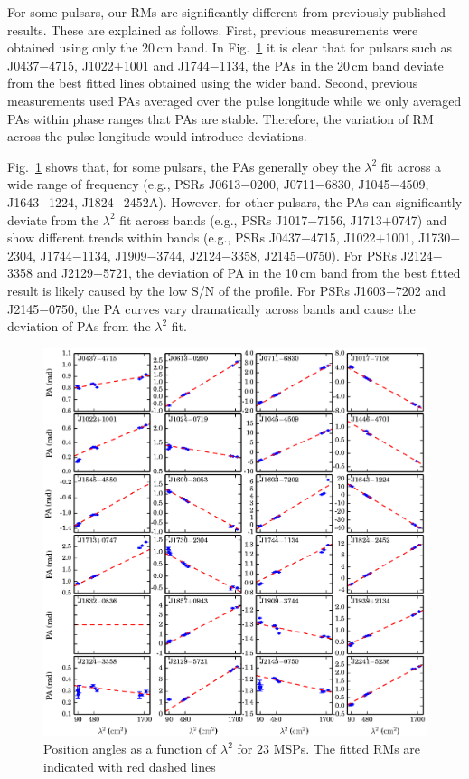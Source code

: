 \documentclass[useAMS,usenatbib]{mn2e}
\begin{document}
For some pulsars, our RMs are significantly different from previously published results. 
These are explained as follows.
%
First, previous measurements were obtained using only the 20\,cm band. 
In Fig.~\ref{rmFreq} it is clear that for pulsars such as J0437$-$4715,
J1022$+$1001 and J1744$-$1134, the PAs in the 20\,cm band deviate from the 
best fitted lines obtained using the wider band.
%
Second, previous measurements used PAs averaged over the pulse longitude 
while we only averaged PAs within phase ranges that PAs are stable. Therefore, 
the variation of RM across the pulse longitude would introduce deviations.
%

Fig.~\ref{rmFreq} shows that, for some pulsars, the PAs generally obey the 
$\lambda^2$ fit across a wide range of frequency (e.g., PSRs J0613$-$0200, 
J0711$-$6830, J1045$-$4509, J1643$-$1224, J1824$-$2452A). 
%
However, for other pulsars, the PAs can significantly deviate from the $\lambda^2$ fit
across bands (e.g., PSRs J1017$-$7156, J1713$+$0747) and show different trends within bands 
(e.g., PSRs J0437$-$4715, J1022$+$1001, J1730$-$2304, J1744$-$1134, J1909$-$3744, J2124$-$3358, 
J2145$-$0750).  
%
For PSRs J2124$-$3358 and J2129$-$5721, the deviation of PA in the 10\,cm band 
from the best fitted result is likely caused by the low S/N of the profile.
%
For PSRs J1603$-$7202 and J2145$-$0750, the PA curves vary dramatically across 
bands and cause the deviation of PAs from the $\lambda^2$ fit.

\begin{figure}
\begin{center}
\includegraphics[width=6 in]{rm.ps}
\caption{Position angles as a function of $\lambda^2$ for $23$ MSPs. The fitted RMs 
are indicated with red dashed lines} 
\label{rmFreq}
\end{center}
\end{figure}
\end{document}
